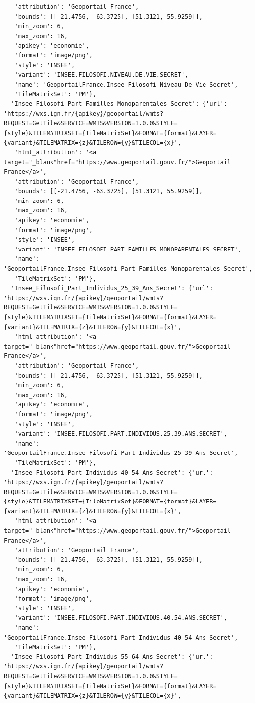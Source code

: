 \documentclass[
  letterpaper,
  DIV=11,
  numbers=noendperiod]{scrreprt}
\begin{document}
\begin{verbatim}
   'attribution': 'Geoportail France',
   'bounds': [[-21.4756, -63.3725], [51.3121, 55.9259]],
   'min_zoom': 6,
   'max_zoom': 16,
   'apikey': 'economie',
   'format': 'image/png',
   'style': 'INSEE',
   'variant': 'INSEE.FILOSOFI.NIVEAU.DE.VIE.SECRET',
   'name': 'GeoportailFrance.Insee_Filosofi_Niveau_De_Vie_Secret',
   'TileMatrixSet': 'PM'},
  'Insee_Filosofi_Part_Familles_Monoparentales_Secret': {'url': 'https://wxs.ign.fr/{apikey}/geoportail/wmts?REQUEST=GetTile&SERVICE=WMTS&VERSION=1.0.0&STYLE={style}&TILEMATRIXSET={TileMatrixSet}&FORMAT={format}&LAYER={variant}&TILEMATRIX={z}&TILEROW={y}&TILECOL={x}',
   'html_attribution': '<a target="_blank"href="https://www.geoportail.gouv.fr/">Geoportail France</a>',
   'attribution': 'Geoportail France',
   'bounds': [[-21.4756, -63.3725], [51.3121, 55.9259]],
   'min_zoom': 6,
   'max_zoom': 16,
   'apikey': 'economie',
   'format': 'image/png',
   'style': 'INSEE',
   'variant': 'INSEE.FILOSOFI.PART.FAMILLES.MONOPARENTALES.SECRET',
   'name': 'GeoportailFrance.Insee_Filosofi_Part_Familles_Monoparentales_Secret',
   'TileMatrixSet': 'PM'},
  'Insee_Filosofi_Part_Individus_25_39_Ans_Secret': {'url': 'https://wxs.ign.fr/{apikey}/geoportail/wmts?REQUEST=GetTile&SERVICE=WMTS&VERSION=1.0.0&STYLE={style}&TILEMATRIXSET={TileMatrixSet}&FORMAT={format}&LAYER={variant}&TILEMATRIX={z}&TILEROW={y}&TILECOL={x}',
   'html_attribution': '<a target="_blank"href="https://www.geoportail.gouv.fr/">Geoportail France</a>',
   'attribution': 'Geoportail France',
   'bounds': [[-21.4756, -63.3725], [51.3121, 55.9259]],
   'min_zoom': 6,
   'max_zoom': 16,
   'apikey': 'economie',
   'format': 'image/png',
   'style': 'INSEE',
   'variant': 'INSEE.FILOSOFI.PART.INDIVIDUS.25.39.ANS.SECRET',
   'name': 'GeoportailFrance.Insee_Filosofi_Part_Individus_25_39_Ans_Secret',
   'TileMatrixSet': 'PM'},
  'Insee_Filosofi_Part_Individus_40_54_Ans_Secret': {'url': 'https://wxs.ign.fr/{apikey}/geoportail/wmts?REQUEST=GetTile&SERVICE=WMTS&VERSION=1.0.0&STYLE={style}&TILEMATRIXSET={TileMatrixSet}&FORMAT={format}&LAYER={variant}&TILEMATRIX={z}&TILEROW={y}&TILECOL={x}',
   'html_attribution': '<a target="_blank"href="https://www.geoportail.gouv.fr/">Geoportail France</a>',
   'attribution': 'Geoportail France',
   'bounds': [[-21.4756, -63.3725], [51.3121, 55.9259]],
   'min_zoom': 6,
   'max_zoom': 16,
   'apikey': 'economie',
   'format': 'image/png',
   'style': 'INSEE',
   'variant': 'INSEE.FILOSOFI.PART.INDIVIDUS.40.54.ANS.SECRET',
   'name': 'GeoportailFrance.Insee_Filosofi_Part_Individus_40_54_Ans_Secret',
   'TileMatrixSet': 'PM'},
  'Insee_Filosofi_Part_Individus_55_64_Ans_Secret': {'url': 'https://wxs.ign.fr/{apikey}/geoportail/wmts?REQUEST=GetTile&SERVICE=WMTS&VERSION=1.0.0&STYLE={style}&TILEMATRIXSET={TileMatrixSet}&FORMAT={format}&LAYER={variant}&TILEMATRIX={z}&TILEROW={y}&TILECOL={x}',

\end{verbatim}
\end{document}
